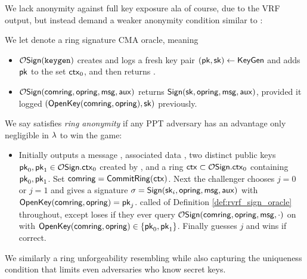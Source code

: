 We lack anonymity against full key exposure ala
 \cite[pp. 6 Def. 4]{cryptoeprint:2005:304} of course, due to the VRF output,
but instead demand a weaker anonymity condition similar to
 \cite[pp. 5 Def. 3]{cryptoeprint:2005:304}:

\begin{definition}\label{def:rvrf_sign_oracle}
We let  denote a ring signature CMA oracle, meaning
\begin{itemize}
\item $\mathcal{O}\mathsf{Sign}(\mathtt{keygen})$ creates and logs a fresh key pair
 $(\mathsf{pk},\mathsf{sk}) \leftarrow {\ensuremath{\mathsf{KeyGen}}}$ and adds $\mathsf{pk}$ to the set $\mathsf{ctx}_0$, and then returns \pk.
\item $\mathcal{O}\mathsf{Sign}(\mathsf{comring},\mathsf{opring},\mathsf{msg},\mathsf{aux})$ returns
 ${\mathsf{Sign}}(\mathsf{sk},\mathsf{opring},\mathsf{msg},\mathsf{aux})$, provided it logged $({\mathsf{OpenKey}}(\mathsf{comring},\mathsf{opring}),\mathsf{sk})$ previously.
\end{itemize}
\end{definition}

\begin{definition}
We say \rVRF satisfies {\em ring anonymity} if
any PPT adversary \adv has an advantage only
 negligible in $\lambda$ to win the game:
\begin{itemize}
\item[]
 Initially \adv outputs a message \msg, associated data \aux,
 two distinct public keys $\mathsf{pk}_0,\mathsf{pk}_1 \in \mathcal{O}\mathsf{Sign}.\mathsf{ctx}_0$ created by ,
 and a ring $\mathsf{ctx} \subset \mathcal{O}\mathsf{Sign}.\mathsf{ctx}_0$ containing $\mathsf{pk}_0,\mathsf{pk}_1$.
 Set $\mathsf{comring} = {\mathsf{CommitRing}}(\mathsf{ctx})$.
 Next the challenger chooses $j=0$ or $j=1$ and gives
  \adv a signature $\sigma = {\mathsf{Sign}}(\mathsf{sk}_i,\mathsf{opring},\mathsf{msg},\mathsf{aux})$ with ${\mathsf{OpenKey}}(\mathsf{comring},\mathsf{opring}) = \mathsf{pk}_j$.
 \adv called  of Definition \ref{def:rvrf_sign_oracle} throughout,
 except \adv loses if they ever query $\mathcal{O}\mathsf{Sign}(\mathsf{comring},\mathsf{opring},\mathsf{msg},\cdot)$
 on \msg with ${\mathsf{OpenKey}}(\mathsf{comring},\mathsf{opring}) \in \{ \mathsf{pk}_0, \mathsf{pk}_1 \}$.
 Finally \adv guesses $j$ and wins if correct.
\end{itemize}
\end{definition}

We similarly a ring unforgeability resembling
 \cite[pp. 7 Def. 7]{cryptoeprint:2005:304} %
while also capturing the uniqueness condition that limits even adversaries who know secret keys.


